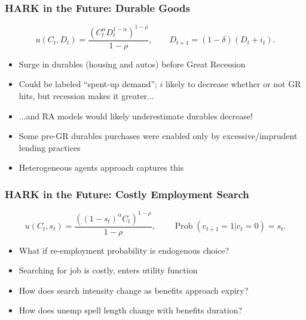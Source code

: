 \documentclass[11pt]{cfpbpresentation}
\newcommand{\Prob}{\operatorname{Prob}}
\begin{document}
\begin{frame}
\frametitle{HARK in the Future: Durable Goods}

\begin{equation*}
u(C_t,D_t) = \frac{(C_t^{\alpha}D_t^{1-\alpha})^{1-\rho}}{1-\rho}, \qquad D_{t+1} = (1 - \delta) (D_t + i_t).
\end{equation*}
\begin{itemize}
\item <1->Surge in durables (housing and autos) before Great Recession

\item <1->Could be labeled ``spent-up demand''; $i$ likely to decrease whether or not GR hits, but recession makes it greater...

\item <2->...and RA models would likely underestimate durables decrease!

\item <2->Some pre-GR durables purchases were enabled only by excessive/imprudent lending practices

\item <3->Heterogeneous agents approach captures this
\end{itemize}

\end{frame}


\begin{frame}
\frametitle{HARK in the Future: Costly Employment Search}

\begin{equation*}
u(C_t,s_t) = \frac{((1-s_t)^{\alpha}C_t)^{1-\rho}}{1-\rho}, \qquad \Prob(e_{t+1} = 1 | e_t = 0) = s_t.
\end{equation*}

\begin{itemize}
\item What if re-employment probability is endogenous choice?

\item Searching for job is costly, enters utility function

\item How does search intensity change as benefits approach expiry?

\item How does unemp spell length change with benefits duration?
\end{itemize}
\end{frame}
\end{document}
